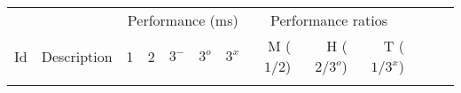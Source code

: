 \begin{tabular}{rlrrrrrrrrrrr}\toprule
&&\multicolumn{5}{c}{Performance (ms)}&\multicolumn{3}{c}{Performance ratios} \\\cmidrule(lr){3-7}\cmidrule(lr){8-10}
Id&Description&1&2& $3^-$&$3^o$&$3^x$&M ($1/2$) &H ($2/3^o$)&T ($1/3^x$)\\\midrule

}
\addlinespace
\bottomrule
\end{tabular}
